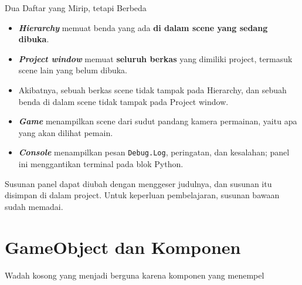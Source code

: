 \documentclass[aspectratio=169,10pt]{beamer}
\begin{document}
\begin{frame}{Dua Daftar yang Mirip, tetapi Berbeda}
\begin{itemize}
  \item \textbf{\emph{Hierarchy}} memuat benda yang ada \textbf{di dalam scene
        yang sedang dibuka}.
  \item \textbf{\emph{Project window}} memuat \textbf{seluruh berkas} yang
        dimiliki project, termasuk scene lain yang belum dibuka.
  \item Akibatnya, sebuah berkas scene tidak tampak pada Hierarchy, dan sebuah
        benda di dalam scene tidak tampak pada Project window.
  \item \textbf{\emph{Game}} menampilkan scene dari sudut pandang kamera
        permainan, yaitu apa yang akan dilihat pemain.
  \item \textbf{\emph{Console}} menampilkan pesan \texttt{Debug.Log},
        peringatan, dan kesalahan; panel ini menggantikan terminal pada blok
        Python.
\end{itemize}
\vspace{0.12cm}
\begin{kiat}
Susunan panel dapat diubah dengan menggeser judulnya, dan susunan itu disimpan
di dalam project. Untuk keperluan pembelajaran, susunan bawaan sudah memadai.
\end{kiat}
\end{frame}

\section{GameObject dan Komponen}
  {Wadah kosong yang menjadi berguna karena komponen yang menempel}
\end{document}
